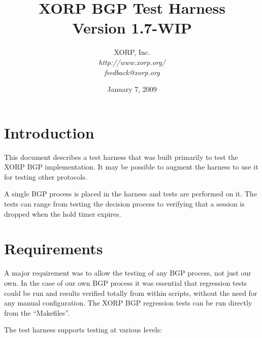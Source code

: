 \documentclass[11pt]{article}
\begin{document}
\title{XORP BGP Test Harness \\
\vspace{1ex}
Version 1.7-WIP}
\author{ XORP, Inc.					\\
         {\it http://www.xorp.org/}			\\
	 {\it feedback@xorp.org}
}
\date{January 7, 2009}

\maketitle


%
%
\newcommand{\coordinator}{{\em coordinator}\xspace}
\newcommand{\testpeer}{{\em test peer}\xspace}
\newcommand{\testpeers}{{\em test peers}\xspace}

\section{Introduction}

This document describes a test harness that was built primarily to
test the XORP BGP implementation. It may be possible to augment the
harness to use it for testing other protocols.

A single BGP process is placed in the harness and tests
are performed on it. The tests can range from testing the decision
process to verifying that a session is dropped when the hold timer expires.

\section{Requirements}

A major requirement was to allow the testing of any BGP process, not
just our own. In the case of our own BGP process it was essential that
regression tests could be run and results verified totally from within
scripts, without the need for any manual configuration. The
XORP BGP regression tests can be run directly from the ``Makefiles''.
\newline

The test harness supports testing at various levels:
\end{document}
